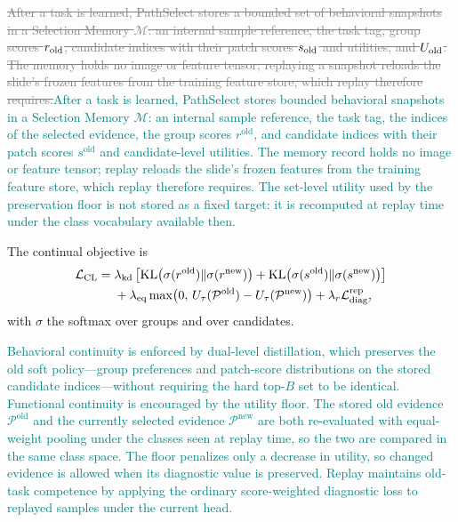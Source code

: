 \documentclass{article}
\newif\ifmarkup \markuptrue
\newcommand{\repc}[3]{\ifmarkup\textcolor{gray}{\sout{#2}}\textcolor{#1}{#3}\else#3\fi}
\newcommand{\repG}[2]{\repc{teal}{#1}{#2}}    %
\def\L{{\cal L}}
\newcommand{\Psel}{\mathcal{P}}
\newcommand{\Mem}{\mathcal{M}}
\begin{document}
\repG{After a task is learned, PathSelect stores a bounded set of behavioral snapshots in a Selection Memory $\Mem$: an internal sample reference, the task tag, group scores $r_{\rm old}$, candidate indices with their patch scores $s_{\rm old}$ and utilities, and $U_{\rm old}$. The memory holds no image or feature tensor; replaying a snapshot reloads the slide's frozen features from the training feature store, which replay therefore requires.}{After a task is learned, PathSelect stores bounded behavioral snapshots in a Selection Memory $\Mem$: an internal sample reference, the task tag, the indices of the selected evidence, the group scores $r^{\mathrm{old}}$, and candidate indices with their patch scores $s^{\mathrm{old}}$ and candidate-level utilities. The memory record holds no image or feature tensor; replay reloads the slide's frozen features from the training feature store, which replay therefore requires. The set-level utility used by the preservation floor is not stored as a fixed target: it is recomputed at replay time under the class vocabulary available then.}

The continual objective is
\begin{align}
\L_{\mathrm{CL}}
={}&
\lambda_{\mathrm{kd}}
\left[
\mathrm{KL}\bigl(\sigma(r^{\mathrm{old}})\Vert \sigma(r^{\mathrm{new}})\bigr)
+
\mathrm{KL}\bigl(\sigma(s^{\mathrm{old}})\Vert \sigma(s^{\mathrm{new}})\bigr)
\right]
\nonumber\\
&+
\lambda_{\mathrm{eq}}
\max\bigl(0,\,U_\tau(\Psel^{\mathrm{old}})-U_\tau(\Psel^{\mathrm{new}})\bigr)
+
\lambda_r \L_{\mathrm{diag}}^{\mathrm{rep}},
\label{eq:lcl}
\end{align}
with $\sigma$ the softmax over groups and over candidates.

\repG{}{Behavioral continuity is enforced by dual-level distillation, which preserves the old soft policy---group preferences and patch-score distributions on the stored candidate indices---without requiring the hard top-$B$ set to be identical. Functional continuity is encouraged by the utility floor. The stored old evidence $\Psel^{\mathrm{old}}$ and the currently selected evidence $\Psel^{\mathrm{new}}$ are both re-evaluated with equal-weight pooling under the classes seen at replay time, so the two are compared in the same class space. The floor penalizes only a decrease in utility, so changed evidence is allowed when its diagnostic value is preserved. Replay maintains old-task competence by applying the ordinary score-weighted diagnostic loss to replayed samples under the current head.}
\end{document}
